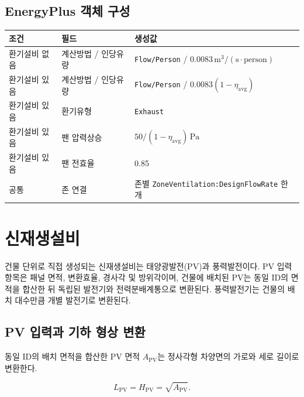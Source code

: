 \subsection{EnergyPlus 객체 구성}

\begin{defaulttable}
  \caption{환기 입력에 따른 EnergyPlus 객체 필드}
  \label{tab:ventilation-object-mapping}
  \small
  \begin{tabularx}{\textwidth}{p{3.0cm}p{3.2cm}X}
    \toprule
    조건 & 필드 & 생성값 \\ \midrule
    환기설비 없음 & 계산방법 / 인당유량 & \texttt{Flow/Person} / $0.0083\,\mathrm{m^3/(s\cdot person)}$ \\
    환기설비 있음 & 계산방법 / 인당유량 & \texttt{Flow/Person} / $0.0083(1-\eta_{\mathrm{avg}})$ \\
    환기설비 있음 & 환기유형 & \texttt{Exhaust} \\
    환기설비 있음 & 팬 압력상승 & $50/(1-\eta_{\mathrm{avg}})\,\mathrm{Pa}$ \\
    환기설비 있음 & 팬 전효율 & 0.85 \\
    공통 & 존 연결 & 존별 \texttt{ZoneVentilation:DesignFlowRate} 한 개 \\ \bottomrule
  \end{tabularx}
\end{defaulttable}

\section{신재생설비}
\label{section:renewable-conversion}

건물 단위로 직접 생성되는 신재생설비는 태양광발전(PV)과 풍력발전이다. PV 입력 항목은 패널 면적, 변환효율, 경사각 및 방위각이며, 건물에 배치된 PV는 동일 ID의 면적을 합산한 뒤 독립된 발전기와 전력분배계통으로 변환된다. 풍력발전기는 건물의 배치 대수만큼 개별 발전기로 변환된다.

\subsection{PV 입력과 기하 형상 변환}

동일 ID의 배치 면적을 합산한 PV 면적 $A_{\mathrm{PV}}$는 정사각형 차양면의 가로와 세로 길이로 변환한다.

\begin{equation}
  L_{\mathrm{PV}}=H_{\mathrm{PV}}=\sqrt{A_{\mathrm{PV}}}.
  \label{eq:pv-square-dimension}
\end{equation}

